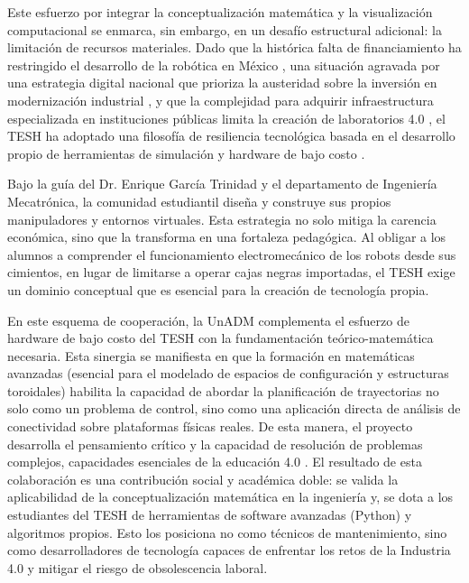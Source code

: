 Este esfuerzo por integrar la conceptualización matemática y
la visualización computacional se enmarca, sin embargo, 
en un desafío estructural adicional: la limitación de recursos materiales.
Dado que la histórica falta de 
financiamiento ha restringido el desarrollo de la robótica en 
México \parencite{UV_Recursos_2016}, una situación agravada por una 
estrategia digital nacional que prioriza la austeridad sobre la inversión en 
modernización industrial \parencite{Solleiro2023}, 
y que la complejidad para adquirir infraestructura especializada en instituciones públicas 
limita la creación de laboratorios 4.0 \parencite{Avalos_IPN_2023}, el TESH 
ha adoptado una filosofía de resiliencia tecnológica basada en el desarrollo propio de herramientas de simulación 
y hardware de bajo costo \parencite{Garcia_Simulacion_2025}. 

Bajo la guía del Dr. Enrique García Trinidad y el departamento de Ingeniería 
Mecatrónica, la comunidad estudiantil diseña y construye sus propios manipuladores y entornos virtuales. 
Esta estrategia no solo mitiga la carencia económica, sino que la transforma en una 
fortaleza pedagógica. Al obligar a los alumnos a comprender el funcionamiento 
electromecánico de los robots desde sus cimientos, en lugar de limitarse a operar cajas negras 
importadas, el TESH exige un dominio conceptual que es esencial para la creación de tecnología propia.

En este esquema de cooperación, la UnADM complementa el esfuerzo de 
hardware de bajo costo del TESH con la fundamentación teórico-matemática 
necesaria. Esta sinergia se manifiesta en que la formación en matemáticas 
avanzadas (esencial para el modelado de espacios de configuración y 
estructuras toroidales) habilita la capacidad de abordar 
la planificación de trayectorias no solo como un problema de control, 
sino como una aplicación directa de análisis de conectividad sobre 
plataformas físicas reales. De esta manera, el proyecto desarrolla el 
pensamiento crítico y la capacidad de resolución de problemas complejos, 
capacidades esenciales de la educación 4.0 \parencite{Zazueta_Educacion40_2023}. 
El resultado de esta colaboración es una contribución social y académica 
doble: se valida la aplicabilidad de la conceptualización matemática 
en la ingeniería y, se dota a los estudiantes del 
TESH de herramientas de software avanzadas (Python) y 
algoritmos propios. Esto los posiciona no como técnicos de mantenimiento, 
sino como desarrolladores de tecnología capaces de enfrentar los 
retos de la Industria 4.0 y mitigar el riesgo de obsolescencia laboral.

